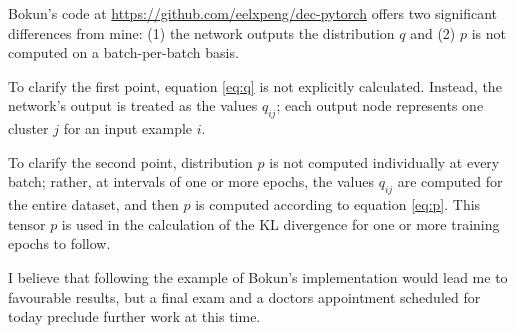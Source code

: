 Bokun's code at \hyperlink{https://github.com/eelxpeng/dec-pytorch}{https://github.com/eelxpeng/dec-pytorch} offers two significant differences from mine: (1) the network outputs the distribution $q$ and (2) $p$ is not computed on a batch-per-batch basis.

To clarify the first point, equation \ref{eq:q} is not explicitly calculated. Instead, the network's output is treated as the values $q_{ij}$; each output node represents one cluster $j$ for an input example $i$.

To clarify the second point, distribution $p$ is not computed individually at every batch; rather, at intervals of one or more epochs, the values $q_{ij}$ are computed for the entire dataset, and then $p$ is computed according to equation \ref{eq:p}. This tensor $p$ is used in the calculation of the KL divergence for one or more training epochs to follow.

I believe that following the example of Bokun's implementation would lead me to favourable results, but a final exam and a doctors appointment scheduled for today preclude further work at this time.
